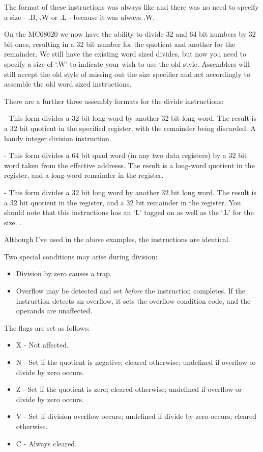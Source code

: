 The format of these instructions was always like  and there was no need to specify a size - .B, .W or .L - because it was always .W.

On the MC68020 we now have the ability to divide 32 and 64 bit numbers by 32 bit ones, resulting in a 32 bit number for the quotient and another for the remainder. We still have the existing word sized divides, but now you need to specify a size of `.W' to indicate your wish to use the old style. Assemblers will still accept the old style of missing out the size specifier and act accordingly to assemble the old word sized instructions.

There are a further three assembly formats for the divide instructions:

 - This form divides a 32 bit long word by another 32 bit long word. The result is a 32 bit quotient in the specified register, with the remainder being discarded. A handy integer division instruction.

 - This form divides a 64 bit quad word (in any two data registers) by a 32 bit word taken from the effective addresss. The result is a long-word quotient in the  register, and a long-word remainder in the  register.

 - This form divides a 32 bit long word by another 32 bit long word. The result is a 32 bit quotient  in the  register, and a 32 bit remainder in the  register. You should note that this instructions has an `L' tagged on as well as the `.L' for the size. .

Although I've used  in the above examples, the  instructions are identical.

Two special conditions may arise during division:

\begin{itemize}
    \item Division by zero causes a trap.
    \item Overflow may be detected and set \emph{before} the instruction completes. If the instruction detects an overflow, it sets the overflow condition code, and the operands are unaffected.
\end{itemize}

The flags are set as follows:

\begin{itemize}
    \item X - Not affected.
    \item N - Set if the quotient is negative; cleared otherwise; undefined if overflow or divide by zero occurs.
    \item Z - Set if the quotient is zero; cleared otherwise; undefined if overflow or divide by zero occurs.
    \item V - Set if division overflow occurs; undefined if divide by zero occurs; cleared otherwise.
    \item C - Always cleared.
\end{itemize}


